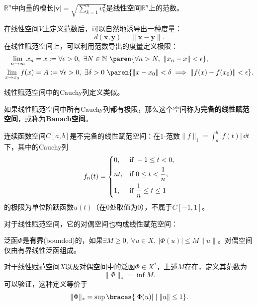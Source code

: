 \begin{example}
    $\mathbb{R}^n$中向量的模长$|\mathbf{v}|=\sqrt{\sum_{k=1}^n v_k^2}$是线性空间$\mathbb{R}^n$上的范数。
\end{example}

在线性空间$V$上定义范数后，可以自然地诱导出一种度量：
\begin{equation}
    d(\mathbf{x},\mathbf{y})=\|\mathbf{x}-\mathbf{y}\|.
\end{equation}
在线性赋范空间上，可以利用范数导出的度量定义极限：
\begin{align}
    \lim_{n\to\infty}x_n&=x:=\forall \epsilon>0,\ \exists N\in\mathbb{N}\ \paren{\forall n>N,\ \|x_n-x\|<\epsilon},\\
    \lim_{x \to x_0} f(x)&=A:=\forall \epsilon>0,\ \exists \delta>0\ \paren{\|x-x_0\|<\delta\implies \|f(x)-f(x_0)\|<\epsilon}.
\end{align}

线性赋范空间中的Cauchy列定义类似。

\begin{definition}[完备的线性赋范空间]
    如果线性赋范空间中所有Cauchy列都有极限，那么这个空间称为\textbf{完备的线性赋范空间}，或称为\textbf{Banach空间}\cite{real_analysis}。
\end{definition}

\begin{example}
    连续函数空间$C[a,b]$是不完备的线性赋范空间：在1-范数$\|f\|_1 =\int_{a}^{b}|f(t)|\,\dd t$下，其中的Cauchy列
    \begin{equation}
        f_n(t)=\begin{dcases}
            0,  & \text{if }-1\leq t <0,         \\
            nt, & \text{if }0\leq t <\frac{1}{n}, \\
            1,  & \text{if }\frac{1}{n}\leq t \leq 1
        \end{dcases}
    \end{equation}
    的极限为单位阶跃函数$u(t)$（在0处取值为0），不属于$C[-1,1]$。
\end{example}

对于线性赋范空间，它的对偶空间也构成线性赋范空间：
\begin{definition}[对偶空间的范数]
    泛函$\Phi$是\textbf{有界}(bounded)的，如果$\exists M\geq 0,\ \forall u\in X,\ |\Phi(u)|\leq M\|u\|$。对偶空间仅由有界线性泛函组成。

    对于线性赋范空间$X$以及对偶空间中的泛函$\Phi\in X^*$，上述$M$存在，定义其范数为
    \begin{equation}
        \|\Phi\|_*=\inf M.
    \end{equation}
    可以验证，这种定义等价于
    \begin{equation}
        \|\Phi\|_*=\sup\braces{|\Phi(u)|\mid \|u\|\leq 1}.
    \end{equation}
\end{definition}

